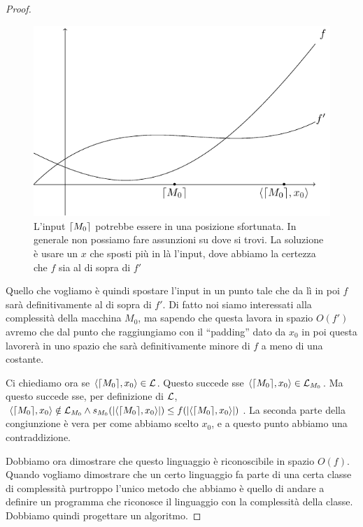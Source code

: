 \begin{proof}
    \begin{figure}[h]
        \begin{center}
            \includegraphics{./img/timespacehierarchies/spacehierarchy.pdf}
            \caption{L'input $\lceil M_{0} \rceil$ potrebbe essere in una posizione sfortunata. In generale
            non possiamo fare assunzioni su dove si trovi. La soluzione è usare un $x$ che sposti
            più in là l'input, dove abbiamo la certezza che $f$ sia al di sopra di $f'$}
            \label{img:spacehierarchy}
        \end{center}
    \end{figure}

    Quello che vogliamo è quindi spostare l'input in un punto tale che da lì in poi $f$ sarà
    definitivamente al di sopra di $f'$. Di fatto noi siamo interessati alla complessità della
    macchina $M_{0}$, ma sapendo che questa lavora in spazio $O(f')$ avremo che dal punto che
    raggiungiamo con il ``padding'' dato da $x_{0}$ in poi questa lavorerà in uno spazio che sarà
    definitivamente minore di $f$ a meno di una costante.

    Ci chiediamo ora se $\langle \lceil M_{0} \rceil, x_{0} \rangle \in \mathcal{L}$. Questo succede sse
    $\langle \lceil M_{0} \rceil, x_{0} \rangle \in \mathcal{L}_{M_{0}}$. Ma questo succede sse, per definizione di
    $\mathcal{L}$, $\langle \lceil M_{0} \rceil, x_{0} \rangle \notin \mathcal{L}_{M_{0}} \land
    s_{M_{0}}(|\langle \lceil M_{0} \rceil, x_{0} \rangle|) \leq f(|\langle \lceil M_{0} \rceil, x_{0} \rangle|)$. La seconda parte
    della congiunzione è vera per come abbiamo scelto $x_{0}$, e a questo punto abbiamo una
    contraddizione.

    Dobbiamo ora dimostrare che questo linguaggio è riconoscibile in spazio $O(f)$. Quando vogliamo
    dimostrare che un certo linguaggio fa parte di una certa classe di complessità purtroppo l'unico
    metodo che abbiamo è quello di andare a definire un programma che riconosce il linguaggio con la
    complessità della classe. Dobbiamo quindi progettare un algoritmo.


\end{proof}
